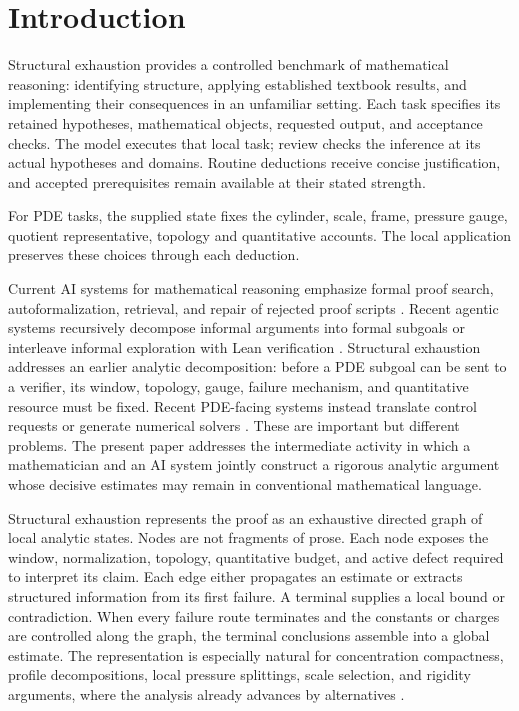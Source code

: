 \documentclass[11pt,reqno]{amsart}
\theoremstyle{plain}
\theoremstyle{definition}
\theoremstyle{remark}
\numberwithin{equation}{section}
\begin{document}
\maketitle

\section{Introduction}
\label{sec:introduction}

Structural exhaustion provides a controlled benchmark of mathematical
reasoning: identifying structure, applying established textbook results, and
implementing their consequences in an unfamiliar setting. Each task specifies
its retained hypotheses, mathematical objects, requested output, and acceptance
checks. The model executes that local task; review checks the inference at its
actual hypotheses and domains. Routine deductions receive concise justification,
and accepted prerequisites remain available at their stated strength.

For PDE tasks, the supplied state fixes the cylinder, scale, frame, pressure
gauge, quotient representative, topology and quantitative accounts. The local
application preserves these choices through each deduction.

Current AI systems for mathematical reasoning emphasize formal proof search,
autoformalization, retrieval, and repair of rejected proof scripts
\cite{WuEtAl2022,JiangEtAl2022,FirstEtAl2023,LuEtAl2024}.
Recent agentic systems recursively decompose informal arguments into formal
subgoals or interleave informal exploration with Lean verification
\cite{VaramballyEtAl2025,OspanovEtAl2025,AchimEtAl2025}.  Structural exhaustion
addresses an earlier analytic decomposition: before a PDE subgoal can be sent
to a verifier, its window, topology, gauge, failure mechanism, and quantitative
resource must be fixed.
Recent PDE-facing systems instead translate control requests or generate
numerical solvers \cite{SorocoEtAl2025,LiEtAl2025}.  These are important but
different problems.  The present paper addresses the intermediate activity in
which a mathematician and an AI system jointly construct a rigorous analytic
argument whose decisive estimates may remain in conventional mathematical
language.

Structural exhaustion represents the proof as an exhaustive directed graph of
local analytic states.  Nodes are not fragments of prose.  Each node exposes
the window, normalization, topology, quantitative budget, and active defect
required to interpret its claim.  Each edge either propagates an estimate or
extracts structured information from its first failure.  A terminal supplies a
local bound or contradiction.  When every failure route terminates and the
constants or charges are controlled along the graph, the terminal conclusions
assemble into a global estimate.  The representation is especially natural for
concentration compactness, profile decompositions, local pressure splittings,
scale selection, and rigidity arguments, where the analysis already advances
by alternatives
\cite{Lions1984a,Lions1984b,Gerard1998,BahouriGerard1999,Keraani2001}.
\end{document}
